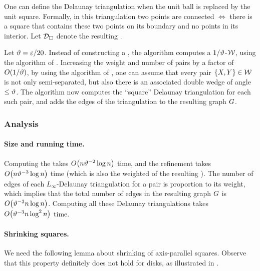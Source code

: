 \documentclass[12pt]{article}%
\begin{document}
One can define the Delaunay triangulation when the unit ball is
replaced by the unit square. Formally, in this triangulation two
points are connected $\iff$ there is a square that contains these two
points on its boundary and no points in its interior. Let
$\mathcal{D}_\square$ denote the resulting .

Let $\vartheta = \varepsilon/20$.  Instead of constructing a \WSPD, the algorithm
computes a $1/\vartheta$-\SSPD $\mathcal{W}$, using the algorithm of
. Increasing the weight and number of pairs by a
factor of $O(1/\vartheta)$, by using the algorithm of ,
one can assume that every pair $\{ X, Y \} \in \mathcal{W}$ is not only
semi-separated, but also there is an associated double wedge of angle
$\leq \vartheta$.  The algorithm now computes the ``square'' Delaunay
triangulation for each such pair, and adds the edges of the
triangulation to the resulting graph $G$.



\subsubsection{Analysis}

\paragraph{Size and running time.}

Computing the \SSPD takes $O\pth{n \epsA^{-2} \log n}$ time, and the
refinement takes $O\pth{n \epsA^{-3} \log n}$ time (which is also the
weighted of the resulting \SSPD). The number of edges of each
$L_\infty$-Delaunay triangulation for a pair is proportion to its
weight, which implies that the total number of edges in the resulting
graph $G$ is $O\pth{ \epsA^{-3} n\log n}$. Computing all these
Delaunay triangulations takes $O\pth{ \epsA^{-3}n \log^2 n}$ time.


\paragraph{Shrinking squares.}
We need the following lemma about shrinking of axis-parallel squares.
Observe that this property definitely does not hold for disks, as
illustrated in .
\end{document}
